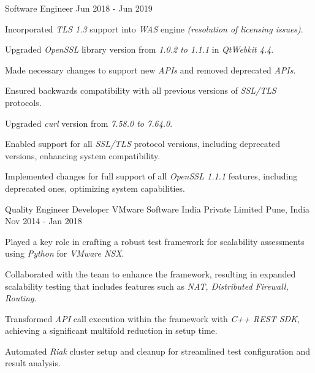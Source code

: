 \begin{cventries}
\cventry
{Software Engineer} %
{} %
{} %
{Jun 2018 - Jun 2019} %
{
\begin{cvitems}
\setlength{\itemsep}{1ex} %
%
\item {Incorporated \textit{TLS 1.3} support into \textit{WAS} engine \textit{(resolution of licensing issues)}.}
	\begin{cvitemsnested}
		\item {Upgraded \textit{OpenSSL} library version from \textit{1.0.2 to 1.1.1} in \textit{QtWebkit 4.4}.}
		\item {Made necessary changes to support new \textit{APIs} and removed deprecated \textit{APIs}.}
		\item {Ensured backwards compatibility with all previous versions of \textit{SSL/TLS} protocols.}
	\end{cvitemsnested}
\item {Upgraded \textit{curl} version from \textit{7.58.0 to 7.64.0}.}
	\begin{cvitemsnested}
		\item {Enabled support for all \textit{SSL/TLS} protocol versions, including deprecated versions, enhancing system compatibility.}
		\item {Implemented changes for full support of all \textit{OpenSSL 1.1.1} features, including deprecated ones, optimizing system capabilities.}
	\end{cvitemsnested}
%
\end{cvitems}
}


\cventry
{Quality Engineer Developer} %
{VMware Software India Private Limited} %
{Pune, India} %
{Nov 2014 - Jan 2018} %
{ %
\begin{cvitems}
\item {Played a key role in crafting a robust test framework for scalability assessments using \textit{Python} for \textit{VMware NSX}.}
\item {Collaborated with the team to enhance the framework, resulting in expanded scalability testing that includes features such as \textit{NAT, Distributed Firewall, Routing}.}
\item {Transformed \textit{API} call execution within the framework with \textit{C++ REST SDK}, achieving a significant multifold reduction in setup time.}
\item {Automated \textit{Riak} cluster setup and cleanup for streamlined test configuration and result analysis.}
\end{cvitems}
}


\end{cventries}
